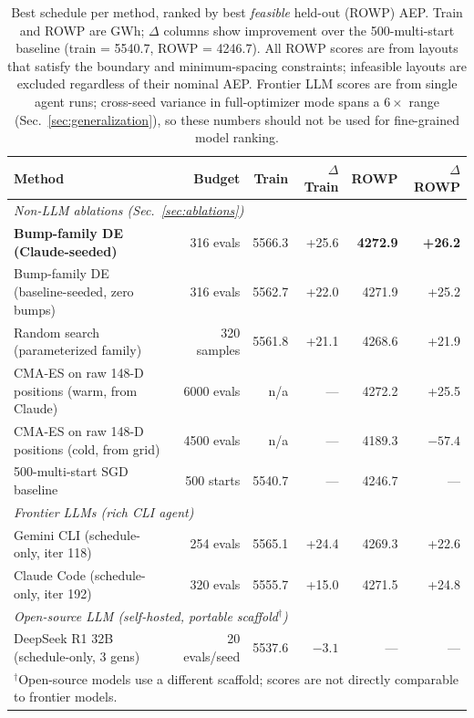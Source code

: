 \begin{table}[t]
\centering
\small
\caption{Best schedule per method, ranked by best \emph{feasible}
held-out (ROWP) AEP. Train and ROWP are GWh; $\Delta$ columns show
improvement over the 500-multi-start baseline (train = 5540.7,
ROWP = 4246.7). All ROWP scores are from layouts that satisfy the
boundary and minimum-spacing constraints; infeasible layouts are
excluded regardless of their nominal AEP. Frontier LLM scores are
from single agent runs; cross-seed variance in full-optimizer mode
spans a $6\!\times$ range (Sec.~\ref{sec:generalization}), so
these numbers should not be used for fine-grained model ranking.}
\label{tab:main}
\begin{tabular}{lrrrrr}
\toprule
\textbf{Method} & \textbf{Budget} & \textbf{Train} & \textbf{$\Delta$Train} & \textbf{ROWP} & \textbf{$\Delta$ROWP} \\
\midrule
\multicolumn{6}{l}{\emph{Non-LLM ablations (Sec.~\ref{sec:ablations})}} \\
\textbf{Bump-family DE (Claude-seeded)}        & 316 evals    & 5566.3 & +25.6 & \textbf{4272.9} & \textbf{+26.2} \\
Bump-family DE (baseline-seeded, zero bumps)   & 316 evals    & 5562.7 & +22.0 & 4271.9 & +25.2 \\
Random search (parameterized family)           & 320 samples  & 5561.8 & +21.1 & 4268.6 & +21.9 \\
CMA-ES on raw 148-D positions (warm, from Claude) & 6000 evals & n/a    & ---    & 4272.2 & +25.5 \\
CMA-ES on raw 148-D positions (cold, from grid)   & 4500 evals & n/a    & ---    & 4189.3 & $-57.4$ \\
500-multi-start SGD baseline                   & 500 starts   & 5540.7 & ---    & 4246.7 & --- \\
\midrule
\multicolumn{6}{l}{\emph{Frontier LLMs (rich CLI agent)}} \\
Gemini CLI (schedule-only, iter 118)           & 254 evals    & 5565.1 & +24.4 & 4269.3 & +22.6 \\
Claude Code (schedule-only, iter 192)          & 320 evals    & 5555.7 & +15.0 & 4271.5 & +24.8 \\
\midrule
\multicolumn{6}{l}{\emph{Open-source LLM (self-hosted, portable scaffold$^\dagger$)}} \\
DeepSeek R1 32B (schedule-only, 3 gens)       & 20 evals/seed & 5537.6 & $-3.1$ & ---   & ---   \\
\multicolumn{6}{l}{\footnotesize $^\dagger$Open-source models use a different scaffold; scores are not directly comparable to frontier models.}
\bottomrule
\end{tabular}
\end{table}

